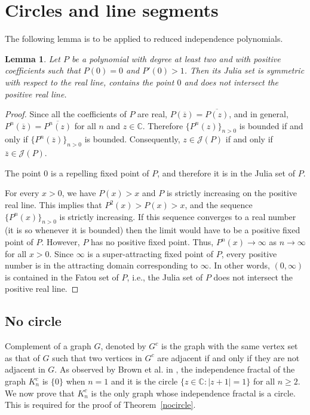 \documentclass[12pt,a4paper]{article}
\theoremstyle{plain}
\newtheorem{lemma}{Lemma}
\numberwithin{equation}{section}
\begin{document}
\section{Circles and line segments}
\label{circles-linesegments}
The following lemma is to be applied to reduced independence polynomials.
\begin{lemma}
    Let \(P\) be a polynomial with degree at least two and with positive coefficients such that $P(0) = 0$ and $P'(0) > 1$. Then its Julia set is symmetric with respect to the real line, contains the point \(0\) and does not intersect the positive real line.
     \label{real_points}
 \end{lemma}
 \begin{proof}
      Since all the coefficients of \(P\) are real, $P(\overline{z})=\overline{P(z)}$, and in general,  $P^n(\overline{z})=\overline{P^n(z)}$ for all $n$ and $z \in \mathbb{C}$.
	Therefore $\{P^n (z)\}_{n>0}$ is bounded if and only if   $\{P^n (\overline{z})\}_{n>0}$ is bounded. Consequently, $z\in \mathcal{J}(P)$ if and only if  $\overline{z}\in \mathcal{J}(P) $. 
	\par The point $0$ is a repelling fixed point of $P$, and therefore it is in the Julia set of $P$. 
 \par 
For every $x>0$, we have $P(x)>x$ and $P$ is strictly increasing on the positive real line. This implies that \(P^2(x)>P(x)>x\), and the sequence $\{P^{n}(x)\}_{n>0}$ is strictly increasing. If this sequence converges to a real number (it is so whenever it is bounded) then the limit would have to be a positive fixed point of $P$. However, $P$ has no positive fixed point. Thus, $P^n (x) \to \infty$ as $n \to \infty$ for all $x>0$. 
Since $\infty$ is a super-attracting fixed point of $P$, every positive number is in the attracting domain corresponding to $\infty$. In other words, $(0, \infty)$ is contained in the Fatou set of $P$, i.e., the Julia set of $P$ does not intersect the positive real line. 
 \end{proof}
%

\subsection{No circle}
Complement of a graph $G$, denoted by $G^c$ is the graph with the same vertex set as that of $G$ such that two vertices in $G^c$ are adjacent if and only if they are not adjacent in $G$. As observed by
Brown et al. in \cite{brownetal2003},  the independence fractal of the graph $K_n ^c$ is $\{0\}$ when $n=1$ and it is the circle $\{z\in \mathbb{C}: |z+1| = 1\}$ for all $n\geq2$. We now prove that  $ K_n^c$ is the only graph whose independence fractal is a circle. This is required for the proof of Theorem~\ref{nocircle}.
\end{document}
